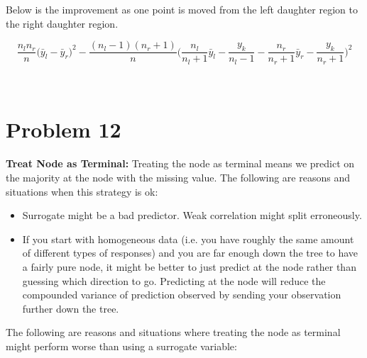 \documentclass[11pt]{article}
\begin{document}
Below is the improvement as one point is moved from the left daughter region to 
the right daughter region. 

$$\frac{n_ln_r}{n} \big(\bar{y}_l - \bar{y}_r\big)^2 - 
\frac{(n_l-1)(n_r+1)}{n}\bigg(\frac{n_l}{n_l+1}\bar{y}_l - \frac{y_k}{n_l-1} - 
\frac{n_r}{n_r+1}\bar{y}_r - \frac{y_k}{n_r + 1}\bigg)^2$$
\newpage
\begin{center}
\ \\
\end{center}

\section*{Problem 12}

\vspace{5 mm}
\noindent
{\bf Treat Node as Terminal:} Treating the node as terminal means we predict on 
the majority at the node with the missing value. The following are reasons and 
situations when this strategy is ok:

\begin{itemize}
\item Surrogate might be a bad predictor. Weak correlation might split 
erroneously.
\item If you start with homogeneous data (i.e. you have roughly the same amount 
of different types of responses) and you are far enough down the tree to have a 
fairly pure node, it might be better to just predict at the node rather than 
guessing which direction to go. Predicting at the node will reduce the 
compounded variance of prediction observed by sending your observation further 
down the tree.
\end{itemize}

\vspace{2 mm}
\noindent
The following are reasons and situations where treating the node as terminal 
might perform worse than using a surrogate variable:
\end{document}
